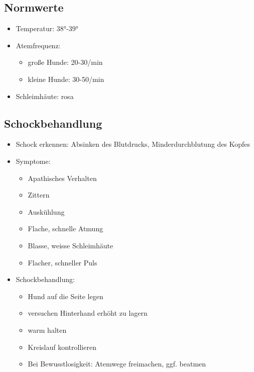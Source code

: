     \subsection{Normwerte}
    \begin{itemize}
        \item Temperatur: 38°-39°
        \item Atemfrequenz:
        \begin{itemize}
            \item große Hunde: 20-30/min
            \item kleine Hunde: 30-50/min
        \end{itemize}
        \item Schleimhäute: rosa
    \end{itemize}

    \subsection{Schockbehandlung}
        \begin{itemize}
            \item Schock erkennen: Absinken des Blutdrucks, Minderdurchblutung des Kopfes
            \item Symptome:
            \begin{itemize}
                \item Apathisches Verhalten
                \item Zittern
                \item Auskühlung
                \item Flache, schnelle Atmung
                \item Blasse, weisse Schleimhäute
                \item Flacher, schneller Puls
            \end{itemize}
            \item Schockbehandlung:
            \begin{itemize}
                \item Hund auf die Seite legen
                \item versuchen Hinterhand erhöht zu lagern
                \item warm halten
                \item Kreislauf kontrollieren
                \item Bei Bewusstlosigkeit: Atemwege freimachen, ggf. beatmen
            \end{itemize}
        \end{itemize}

